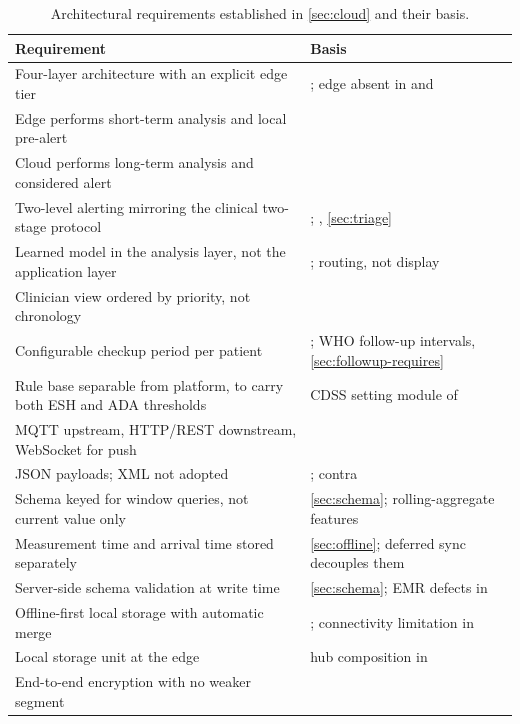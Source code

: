 \documentclass[12pt,a4paper,oneside]{report}
\begin{document}
\begin{table}[htbp]
\centering\footnotesize
\caption{Architectural requirements established in \cref{sec:cloud} and their basis.}\label{tab:spec22}
\begin{tabularx}{\textwidth}{@{}X >{\raggedright\arraybackslash}p{5.9cm}@{}}
\toprule
\textbf{Requirement} & \textbf{Basis} \\
\midrule
Four-layer architecture with an explicit edge tier & \textcite{mucchi2021}; edge absent in \textcite{efendi2025} and \textcite{yazdani2018} \\
Edge performs short-term analysis and local pre-alert & \textcite{mucchi2021} \\
Cloud performs long-term analysis and considered alert & \textcite{mucchi2021} \\
Two-level alerting mirroring the clinical two-stage protocol & \textcite{mucchi2021}; \textcite{mihevc2025}, \cref{sec:triage} \\
Learned model in the analysis layer, not the application layer & \textcite{liu2025review}; routing, not display \\
Clinician view ordered by priority, not chronology & \textcite{yazdani2018} \\
Configurable checkup period per patient & \textcite{yazdani2018}; WHO follow-up intervals, \cref{sec:followup-requires} \\
Rule base separable from platform, to carry both ESH and ADA thresholds & CDSS setting module of \textcite{yazdani2018} \\
MQTT upstream, HTTP/REST downstream, WebSocket for push & \textcite{efendi2025} \\
JSON payloads; XML not adopted & \textcite{efendi2025}; contra \textcite{yazdani2018} \\
Schema keyed for window queries, not current value only & \cref{sec:schema}; rolling-aggregate features \\
Measurement time and arrival time stored separately & \cref{sec:offline}; deferred sync decouples them \\
Server-side schema validation at write time & \cref{sec:schema}; EMR defects in \textcite{liu2025review} \\
Offline-first local storage with automatic merge & \textcite{efendi2025}; connectivity limitation in \textcite{cadrage2026} \\
Local storage unit at the edge & hub composition in \textcite{mucchi2021} \\
End-to-end encryption with no weaker segment & \textcite{mucchi2021} \\

\end{tabularx}
\end{table}
\end{document}
